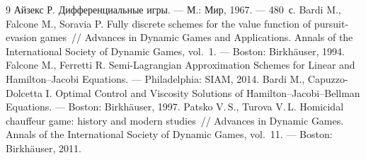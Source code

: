\documentclass[14pt,a4paper]{extarticle}
\begin{document}
	\begin{thebibliography}{9}
		 Айзекс Р. Дифференциальные игры. --- М.: Мир, 1967. --- 480~с.
		 Bardi M., Falcone M., Soravia P. Fully discrete schemes for the value function of pursuit-evasion games~// Advances in Dynamic Games and Applications. Annals of the International Society of Dynamic Games, vol.~1. --- Boston: Birkhäuser, 1994.
		 Falcone M., Ferretti R. Semi-Lagrangian Approximation Schemes for Linear and Hamilton--Jacobi Equations. --- Philadelphia: SIAM, 2014.
		 Bardi M., Capuzzo-Dolcetta I. Optimal Control and Viscosity Solutions of Hamilton--Jacobi--Bellman Equations. --- Boston: Birkhäuser, 1997.
		 Patsko V.\,S., Turova V.\,L. Homicidal chauffeur game: history and modern studies~// Advances in Dynamic Games. Annals of the International Society of Dynamic Games, vol.~11. --- Boston: Birkhäuser, 2011.
	\end{thebibliography}
\end{document}
